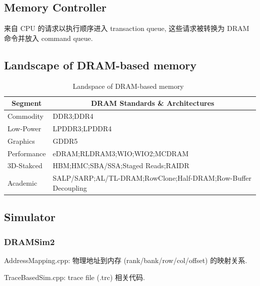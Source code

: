 \documentclass[UTF8,12pt,a4paper]{article}
\begin{document}
\subsection{Memory Controller}
来自 CPU 的请求以执行顺序进入 transaction queue,
这些请求被转换为 DRAM 命令并放入 command queue.

\subsection{Landscape of DRAM-based memory}
\begin{table}
  \begin{small}
    \caption{Landspace of DRAM-based memory~\cite{DBLP:journals/cal/KimYM16}}
    \label{tab:memory_landscape}
    \begin{center}
      \begin{tabular}[c]{l|l}
        \hline
        \multicolumn{1}{c|}{\textbf{Segment}} & 
        \multicolumn{1}{c}{\textbf{DRAM Standards \& Architectures}} \\
        \hline
        Commodity & DDR3;DDR4 \\
        Low-Power & LPDDR3;LPDDR4 \\
        Graphics & GDDR5 \\
        Performance & eDRAM;RLDRAM3;WIO;WIO2;MCDRAM \\
        3D-Stakced & HBM;HMC;SBA/SSA;Staged Reads;RAIDR \\
        Academic & SALP/SARP;AL/TL-DRAM;RowClone;Half-DRAM;Row-Buffer Decoupling \\
        \hline
      \end{tabular}
    \end{center}
  \end{small}
\end{table}

\subsection{Simulator}
\subsubsection{DRAMSim2}
\begin{compactitem}
  \item AddressMapping.cpp: 物理地址到内存 (rank/bank/row/col/offset) 的映射关系.
  \item TraceBasedSim.cpp: trace file (.trc) 相关代码.
\end{compactitem}
\end{document}

